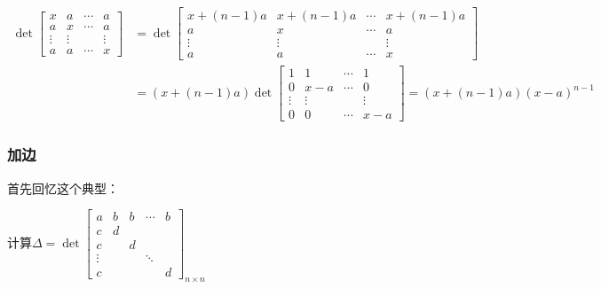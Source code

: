                 \begin{solution}
                    \begin{equation*}
                        \begin{split}
                             \det\begin{bmatrix}x&a&\cdots&a\\a&x&\cdots&a\\\vdots&\vdots&&\vdots\\a&a&\cdots&x\end{bmatrix}&=\det\begin{bmatrix}x+(n-1)a&x+(n-1)a&\cdots&x+(n-1)a\\a&x&\cdots&a\\\vdots&\vdots&&\vdots\\a&a&\cdots&x\end{bmatrix} \\
                                                                                                                            &=(x+(n-1)a)\det\begin{bmatrix}1&1&\cdots&1\\0&x-a&\cdots&0\\\vdots&\vdots&&\vdots\\0&0&\cdots&x-a\end{bmatrix}=(x+(n-1)a)(x-a)^{n-1}
                        \end{split}
                    \end{equation*}
                \end{solution}

            \subsubsection{加边}

                首先回忆这个典型：

                \begin{example}
                    计算$\Delta=\det\begin{bmatrix}a&b&b&\cdots&b\\c&d&&&\\c&&d&&\\\vdots&&&\ddots&\\c&&&&d\end{bmatrix}_{n\times n}$
                \end{example}

